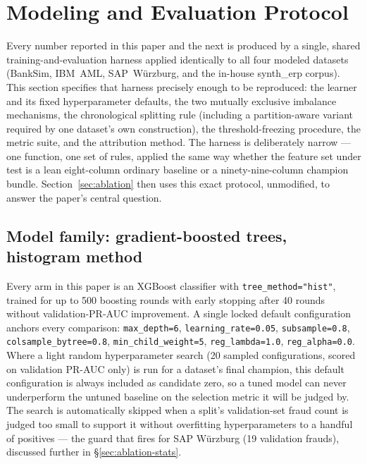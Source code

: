 \section{Modeling and Evaluation Protocol}\label{sec:protocol}

Every number reported in this paper and the next is produced by a single, shared training-and-evaluation harness applied identically to all four modeled datasets (BankSim, IBM~AML, SAP~W\"urzburg, and the in-house synth\_erp corpus). This section specifies that harness precisely enough to be reproduced: the learner and its fixed hyperparameter defaults, the two mutually exclusive imbalance mechanisms, the chronological splitting rule (including a partition-aware variant required by one dataset's own construction), the threshold-freezing procedure, the metric suite, and the attribution method. The harness is deliberately narrow — one function, one set of rules, applied the same way whether the feature set under test is a lean eight-column ordinary baseline or a ninety-nine-column champion bundle. Section~\ref{sec:ablation} then uses this exact protocol, unmodified, to answer the paper's central question.

\subsection{Model family: gradient-boosted trees, histogram method}
Every arm in this paper is an XGBoost classifier \cite{chen2016xgboost} with \texttt{tree\_method="hist"}, trained for up to 500 boosting rounds with early stopping after 40 rounds without validation-PR-AUC improvement. A single locked default configuration anchors every comparison: \texttt{max\_depth=6}, \texttt{learning\_rate=0.05}, \texttt{subsample=0.8}, \texttt{colsample\_bytree=0.8}, \texttt{min\_child\_weight=5}, \texttt{reg\_lambda=1.0}, \texttt{reg\_alpha=0.0}. Where a light random hyperparameter search (20 sampled configurations, scored on validation PR-AUC only) is run for a dataset's final champion, this default configuration is always included as candidate zero, so a tuned model can never underperform the untuned baseline on the selection metric it will be judged by. The search is automatically skipped when a split's validation-set fraud count is judged too small to support it without overfitting hyperparameters to a handful of positives — the guard that fires for SAP W\"urzburg (19 validation frauds), discussed further in \S\ref{sec:ablation-stats}.

